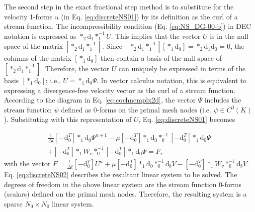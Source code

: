 \documentclass[final,12pt,times]{elsarticle}
\begin{document}
The second step in the exact fractional step method is to substitute for the velocity 1-forms $u$ (in Eq. \eqref{eq:discreteNS01}) by its definition as the curl of a stream function. The incompressibility condition (Eq. \eqref{eq:NS_DG-00-b}) in DEC notation is expressed as $\ast_2 \textrm{d}_1 \ast^{-1}_1 U$. This implies that the vector $U$ is in the null space of the matrix $[\ast_2 \textrm{d}_1 \ast^{-1}_1]$. Since $[\ast_2 \textrm{d}_1 \ast^{-1}_1] [\ast_1 \textrm{d}_0] = \ast_2 \textrm{d}_1 \textrm{d}_0 = 0$, the columns of the matrix $[\ast_1 \textrm{d}_0]$ then contain a basis of the null space of $[\ast_2 \textrm{d}_1 \ast^{-1}_1]$. Therefore, the vector $U$ can uniquely be expressed in terms of the basis $[\ast_1 \textrm{d}_0]$; i.e., $U = \ast_1 \textrm{d}_0 \Psi$. In vector calculus notation, this is equivalent to expressing a divergence-free velocity vector as the curl of a stream function. According to the diagram in Eq. \eqref{eq:cochncmplx2d}, the vector $\Psi$ includes the stream function $\psi$ defined as 0-forms on the primal mesh nodes (i.e. $\psi \in C^0(K)$). Substituting with this representation of $U$, Eq. \eqref{eq:discreteNS01} becomes    

\begin{multline}
\label{eq:discreteNS02}
\frac{1}{\Delta t} [-\textrm{d}^T_0] \ast_1 \textrm{d}_0 \Psi^{n+1} - \mu [-\textrm{d}^T_0] \ast_1 \textrm{d}_0 \ast^{-1}_0 [-\textrm{d}^T_0] \ast_1 \textrm{d}_0 \Psi \\ + [-\textrm{d}^T_0] \ast_1 W_v \ast^{-1}_0 [-\textrm{d}^T_0] \ast_1 \textrm{d}_0 \Psi =  F, 
\end{multline}
with the vector $F = \frac{1}{\Delta t} [-\textrm{d}^T_0] U^n + \mu [-\textrm{d}^T_0] \ast_1 \textrm{d}_0 \ast^{-1}_0  \textrm{d}_b V -  [-\textrm{d}^T_0] \ast_1 W_v \ast^{-1}_0  \textrm{d}_b V $. Eq. \eqref{eq:discreteNS02} describes the resultant linear system to be solved. The degrees of freedom in the above linear system are the stream function 0-forms (scalars) defined on the primal mesh nodes. Therefore, the resulting system is a sparse $N_0 \times N_0$ linear system.
\end{document}
